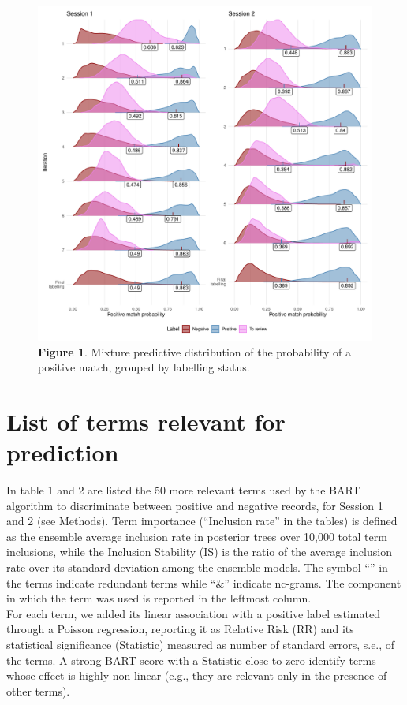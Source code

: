 \documentclass[
]{article}
\begin{document}
\begin{figure}
\centering
\includegraphics{S2.Additional_outputs_files/figure-latex/posterior_distributions-1.pdf}
\caption{\textbf{Figure 1}. Mixture predictive distribution of the
probability of a positive match, grouped by labelling status.}
\end{figure}

\hypertarget{list-of-terms-relevant-for-prediction}{%
\section{List of terms relevant for
prediction}\label{list-of-terms-relevant-for-prediction}}

In table 1 and 2 are listed the 50 more relevant terms used by the BART
algorithm to discriminate between positive and negative records, for
Session 1 and 2 (see Methods). Term importance (``Inclusion rate'' in
the tables) is defined as the ensemble average inclusion rate in
posterior trees over 10,000 total term inclusions, while the Inclusion
Stability (IS) is the ratio of the average inclusion rate over its
standard deviation among the ensemble models. The symbol ``\textbar{}''
in the terms indicate redundant terms while ``\&'' indicate nc-grams.
The component in which the term was used is reported in the leftmost
column.\\
For each term, we added its linear association with a positive label
estimated through a Poisson regression, reporting it as Relative Risk
(RR) and its statistical significance (Statistic) measured as number of
standard errors, s.e., of the terms. A strong BART score with a
Statistic close to zero identify terms whose effect is highly non-linear
(e.g., they are relevant only in the presence of other terms).
\end{document}
